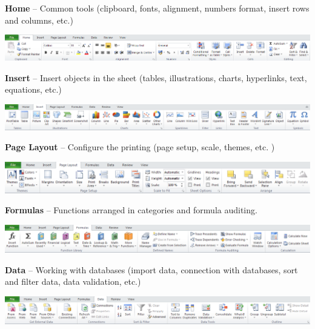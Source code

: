 \textbf{Home} – Common tools (clipboard, fonts, alignment, numbers format, insert rows and columns, etc.)

\begin{center}
\includegraphics[max width=\linewidth]{../img/excel_2010_home_ribbon.png}
\end{center}

\textbf{Insert} – Insert objects in the sheet (tables, illustrations, charts, hyperlinks, text, equations, etc.)

\begin{center}
\includegraphics[max width=\linewidth]{../img/excel_2010_insert_ribbon.png}
\end{center}

\textbf{Page Layout} – Configure the printing (page setup, scale, themes, etc. )

\begin{center}
\includegraphics[max width=\linewidth]{../img/excel_2010_page_layout_ribbon.png}
\end{center}

\textbf{Formulas} – Functions arranged in categories and formula auditing.

\begin{center}
\includegraphics[max width=\linewidth]{../img/excel_2010_formulas_ribbon.png}
\end{center}

\textbf{Data} – Working with databases (import data, connection with databases, sort and filter data, data validation, etc.)

\begin{center}
\includegraphics[max width=\linewidth]{../img/excel_2010_data_ribbon.png}
\end{center}

